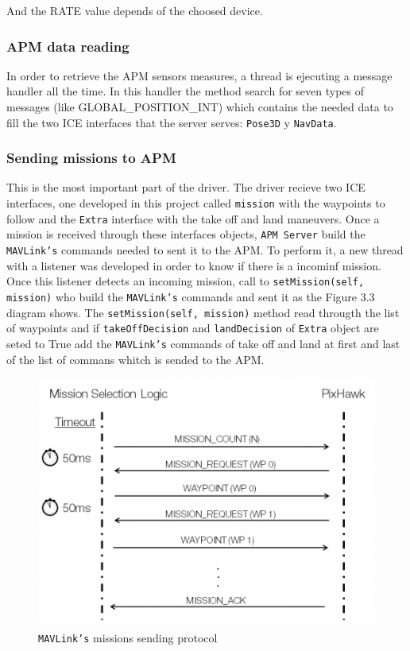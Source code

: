\documentclass{llncs}
\begin{document}
And the RATE value depends of the choosed device.


\subsubsection{APM data reading}
\label{subsec:apm_data_reading}

In order to retrieve the APM sensors measures, a thread is ejecuting a message handler all the time.
In this handler the method search for seven types of messages (like GLOBAL\_POSITION\_INT) which contains the needed data to fill the two ICE interfaces that the server serves: \texttt{Pose3D} y \texttt{NavData}.


\subsubsection{Sending missions to APM}
\label{sec:mission_apm}

This is the most important part of the driver. The driver recieve two ICE interfaces, one developed in this project called \texttt{mission} with the waypoints to follow and the \texttt{Extra} interface with the take off and land maneuvers.
Once a mission is received through these interfaces objects, \texttt{APM Server} build the \texttt{MAVLink's} commands needed to sent it to the APM. To perform it, a new thread with a listener was developed in order to know if there is a incominf mission.
Once this listener detects an incoming mission, call to \texttt{setMission(self, mission)} who build the \texttt{MAVLink's} commands and sent it as the Figure 3.3 diagram shows.
The \texttt{setMission(self, mission)} method read througth the list of waypoints and if \texttt{takeOffDecision} and \texttt{landDecision} of \texttt{Extra} object are seted to True add the \texttt{MAVLink's} commands of take off and land at first and last of the list of commans whitch is sended to the APM.
 

\begin{figure}[h]
  \centering
  \includegraphics[scale=0.70]{img/waypoint-protocol-sendlist.png}
  \caption{\texttt{MAVLink's} missions sending protocol}
  \label{fig:misiones_mavlink}
\end{figure}
\end{document}
